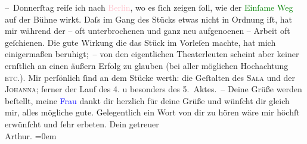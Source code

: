            \pstart
           – Donnerſtag reiſe ich nach \textcolor{pink}{Berlin}{}\ledrightnote{\textcolor{pink}{Berlin}}, wo es ſich
               zeigen ſoll, wie der \textcolor{green}{Einſame Weg}{}\ledrightnote{\textcolor{green}{Der einsame Weg. Schauspiel in fünf Akten}} auf der Bühne
               wirkt. Daſs im Gang des Stücks etwas nicht in Ordnung iſt, hat mir während der – oft
               unterbrochenen und ganz neu aufgeno{\geminationm}enen – Arbeit oft
               geſchienen. Die gute Wirkung {\pb}die das Stück im
               Vorleſen machte, hat mich einigermaßen beruhigt; – von den eigentlichen Theaterleuten
               scheint aber keiner ernſtlich an einen äußern Erfolg zu glauben (bei aller möglichen
               Hochachtung \textsc{etc.}). Mir perſönlich ſind an dem Stücke werth:
               die Geſtalten des \textsc{Sala} und der \textsc{Johanna}; ferner der Lauf des 4. u besonders des 5. Aktes. –\pend
           \pstart
           Deine Grüße werden beſtellt, meine \textcolor{blue}{Frau}{} dankt dir herzlich {\pb}für deine Grüße und
               wünſcht dir gleich mir, alles mögliche gute.\pend
           \pstart
           Gelegentlich ein Wort von dir zu hören wäre mir höchſt erwünſcht und ſehr
               erbeten.\pend
           \pstart
           Dein getreuer{\\[\baselineskip]}\spacefill\mbox{Arthur.}\pend
           \leftskip=0em{}\endnumbering{}  
      